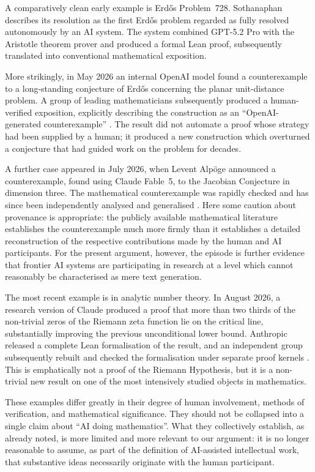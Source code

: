 \documentclass[12pt]{article}
\begin{document}
A comparatively clean early example is Erd\H{o}s Problem~728. Sothanaphan \citeyearpar{sothanaphan2026erdos728} describes its resolution as the first Erd\H{o}s problem regarded as fully resolved autonomously by an AI system. The system combined GPT-5.2 Pro with the Aristotle theorem prover and produced a formal Lean proof, subsequently translated into conventional mathematical exposition.

More strikingly, in May 2026 an internal OpenAI model found a counterexample to a long-standing conjecture of Erd\H{o}s concerning the planar unit-distance problem. A group of leading mathematicians subsequently produced a human-verified exposition, explicitly describing the construction as an ``OpenAI-generated counterexample'' \citep{alonEtAl2026unitdistance}. The result did not automate a proof whose strategy had been supplied by a human; it produced a new construction which overturned a conjecture that had guided work on the problem for decades.

A further case appeared in July 2026, when Levent Alp\"oge announced a counterexample, found using Claude Fable~5, to the Jacobian Conjecture in dimension three. The mathematical counterexample was rapidly checked and has since been independently analysed and generalised \citep{gao2026jacobian,lee2026jacobian}. Here some caution about provenance is appropriate: the publicly available mathematical literature establishes the counterexample much more firmly than it establishes a detailed reconstruction of the respective contributions made by the human and AI participants. For the present argument, however, the episode is further evidence that frontier AI systems are participating in research at a level which cannot reasonably be characterised as mere text generation.

The most recent example is in analytic number theory. In August 2026, a research version of Claude produced a proof that more than two thirds of the non-trivial zeros of the Riemann zeta function lie on the critical line, substantially improving the previous unconditional lower bound. Anthropic released a complete Lean formalisation of the result, and an independent group subsequently rebuilt and checked the formalisation under separate proof kernels \citep{claude2026zeta,riemannlabs2026zeta}. This is emphatically not a proof of the Riemann Hypothesis, but it is a non-trivial new result on one of the most intensively studied objects in mathematics.

These examples differ greatly in their degree of human involvement, methods of verification, and mathematical significance. They should not be collapsed into a single claim about ``AI doing mathematics''. What they collectively establish, as already noted, is more limited and more relevant to our argument: it is no longer reasonable to assume, as part of the definition of AI-assisted intellectual work, that substantive ideas necessarily originate with the human participant.
\end{document}
